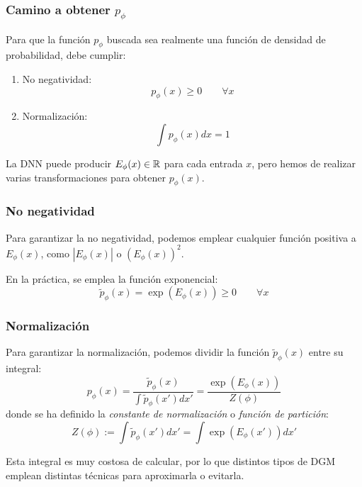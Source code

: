 \documentclass{beamer}
\begin{document}
\begin{frame}
	\frametitle{Camino a obtener $p_{\phi}$}
	Para que la función $p_{\phi}$ buscada sea realmente una función de densidad de probabilidad, debe cumplir:
	\begin{enumerate}
		\item No negatividad:
		\begin{equation*}
			p_{\phi}(x) \geq 0 \qquad \forall x
		\end{equation*}
		\item Normalización:
		\begin{equation*}
			\int p_{\phi}(x) dx = 1
		\end{equation*}
	\end{enumerate}

	\pause

	La DNN puede producir $E_{\phi}(x) \in \mathbb{R}$ para cada entrada $x$, pero hemos de realizar varias transformaciones para obtener $p_{\phi}(x)$.
\end{frame}
\begin{frame}
	\frametitle{No negatividad}

	Para garantizar la no negatividad, podemos emplear cualquier función positiva a $E_{\phi}(x)$, como $|E_{\phi}(x)|$ o $(E_{\phi}(x))^2$.\vspace{1cm} \pause 
	
	En la práctica, se emplea la función exponencial:
	\begin{equation*}
		\tilde{p}_{\phi}(x) = \exp(E_{\phi}(x)) \geq 0 \qquad \forall x
	\end{equation*}
\end{frame}

\begin{frame}
	\frametitle{Normalización}
	Para garantizar la normalización, podemos dividir la función $\tilde{p}_{\phi}(x)$ entre su integral:
	\begin{equation*}
		p_{\phi}(x) = \dfrac{\tilde{p}_{\phi}(x)}{\displaystyle
		\int \tilde{p}_{\phi}(x') dx'} = \frac{\exp(E_{\phi}(x))}{Z({\phi})}
	\end{equation*}
	donde se ha definido la \emph{constante de normalización} o \emph{función de partición}:
	\begin{equation*}
		Z({\phi}) := \int \tilde{p}_{\phi}(x') dx' = \int \exp(E_{\phi}(x')) dx'
	\end{equation*}
	
	\pause
	Esta integral es muy costosa de calcular, por lo que distintos tipos de DGM emplean distintas técnicas para aproximarla o evitarla.
\end{frame}
\end{document}
